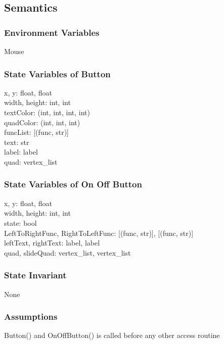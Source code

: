 \documentclass{article}
\begin{document}
\subsection {Semantics}

\subsubsection {Environment Variables}
Mouse

\subsubsection {State Variables of Button}
x, y: float, float\\
width, height: int, int\\
textColor: (int, int, int, int)\\
quadColor: (int, int, int)\\
funcList: [(func, str)]\\
text: str\\
label: label\\
quad: vertex\_list

\subsubsection {State Variables of On Off Button}
x, y: float, float\\
width, height: int, int\\
state: bool\\
LeftToRightFunc, RightToLeftFunc: [(func, str)], [(func, str)]\\
leftText, rightText: label, label\\
quad, slideQuad: vertex\_list, vertex\_list

\subsubsection {State Invariant}
None

\subsubsection {Assumptions}
Button() and OnOffButton() is called before any other access routine
\end{document}
